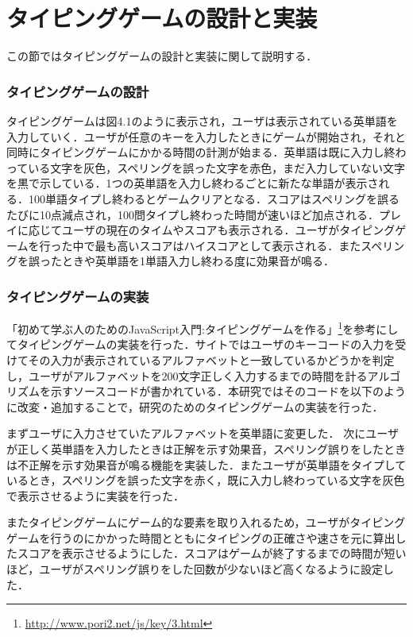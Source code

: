 \chapter{タイピングゲームの設計と実装}
この節ではタイピングゲームの設計と実装に関して説明する．

\subsection{タイピングゲームの設計}
タイピングゲームは図4.1のように表示され，ユーザは表示されている英単語を入力していく．ユーザが任意のキーを入力したときにゲームが開始され，それと同時にタイピングゲームにかかる時間の計測が始まる．英単語は既に入力し終わっている文字を灰色，スペリングを誤った文字を赤色，まだ入力していない文字を黒で示している．1つの英単語を入力し終わるごとに新たな単語が表示される．100単語タイプし終わるとゲームクリアとなる．スコアはスペリングを誤るたびに10点減点され，100問タイプし終わった時間が速いほど加点される．プレイに応じてユーザの現在のタイムやスコアも表示される．ユーザがタイピングゲームを行った中で最も高いスコアはハイスコアとして表示される．またスペリングを誤ったときや英単語を1単語入力し終わる度に効果音が鳴る．

\subsection{タイピングゲームの実装}
「初めて学ぶ人のためのJavaScript入門:タイピングゲームを作る」\footnote{\url{http://www.pori2.net/js/key/3.html}}を参考にしてタイピングゲームの実装を行った．サイトではユーザのキーコードの入力を受けてその入力が表示されているアルファベットと一致しているかどうかを判定し，ユーザがアルファベットを200文字正しく入力するまでの時間を計るアルゴリズムを示すソースコードが書かれている．本研究ではそのコードを以下のように改変・追加することで，研究のためのタイピングゲームの実装を行った．

まずユーザに入力させていたアルファベットを英単語に変更した．
次にユーザが正しく英単語を入力したときは正解を示す効果音，スペリング誤りをしたときは不正解を示す効果音が鳴る機能を実装した．またユーザが英単語をタイプしているとき，スペリングを誤った文字を赤く，既に入力し終わっている文字を灰色で表示させるように実装を行った．

またタイピングゲームにゲーム的な要素を取り入れるため，ユーザがタイピングゲームを行うのにかかった時間とともにタイピングの正確さや速さを元に算出したスコアを表示させるようにした．スコアはゲームが終了するまでの時間が短いほど，ユーザがスペリング誤りをした回数が少ないほど高くなるように設定した．

